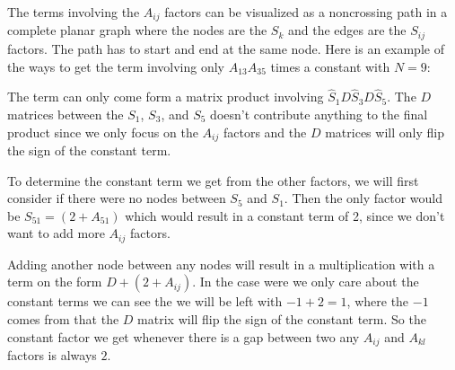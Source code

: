 \documentclass[english,master]{liumaiex}
\theoremstyle{plain}
\theoremstyle{definition}
\newcommand\todo[1]{\textcolor{red}{#1}}
\newcommand{\dotposition}[1]{
    ({-360/\n * (#1 - 1) + 90}:\radius)
}
\begin{document}
The terms involving the $A_{ij}$ factors can be visualized as a noncrossing path in a complete planar graph where the nodes are the $S_k$ and the edges are the $S_{ij}$ factors. The path has to start and end at the same node. Here is an example of the ways to get the term involving only $A_{13}A_{35}$ times a constant with $N = 9$:
\begin{center}
\end{center}

The term can only come form a matrix product involving $\hat{S}_1D\hat{S}_3D\hat{S}_5$. The $D$ matrices between the $S_1$, $S_3$, and $S_5$ doesn't contribute anything to the final product since we only focus on the $A_{ij}$ factors and the $D$ matrices will only flip the sign of the constant term.


To determine the constant term we get from the other factors, we will first consider if there were no nodes between $S_5$ and $S_1$. Then the only factor would be $S_{51} = (2 + A_{51})$ which would result in a constant term of 2, since we don't want to add more $A_{ij}$ factors.

Adding another node between any nodes will result in a multiplication with a term on the form $D + (2 + A_{ij})$. In the case were we only care about the constant terms we can see the we will be left with $-1 + 2 = 1$, where the $-1$ comes from that the $D$ matrix will flip the sign of the constant term. So the constant factor we get whenever there is a gap between two any $A_{ij}$ and $A_{kl}$ factors is always $2$.
\end{document}
